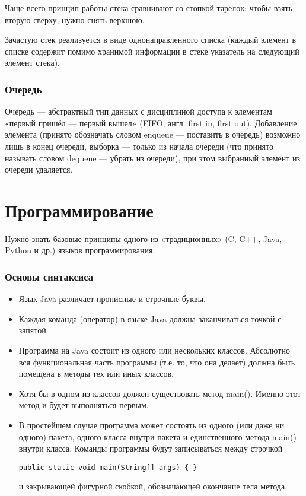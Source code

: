 \documentclass[12pt]{matmex-diploma}
\begin{document}
            Чаще всего принцип работы стека сравнивают со стопкой тарелок: чтобы взять вторую сверху, нужно снять верхнюю.
            
            Зачастую стек реализуется в виде однонаправленного списка (каждый элемент в списке содержит помимо хранимой информации в стеке указатель на следующий элемент стека).
            
        \subsubsection*{Очередь}
            Очередь — абстрактный тип данных с дисциплиной доступа к элементам «первый пришёл — первый вышел» (FIFO, англ. first in, first out). Добавление элемента (принято обозначать словом enqueue — поставить в очередь) возможно лишь в конец очереди, выборка — только из начала очереди (что принято называть словом dequeue — убрать из очереди), при этом выбранный элемент из очереди удаляется.
            
\section{Программирование}     

    Нужно знать базовые принципы одного из «традиционных» (C, C++, Java, Python и др.) языков программирования.
    
    \subsubsection*{Основы синтаксиса}
        \begin{itemize}
            \item Язык Java различает прописные и строчные буквы.
            \item Каждая команда (оператор) в языке Java должна заканчиваться точкой с запятой.
            \item Программа на Java состоит из одного или нескольких классов. Абсолютно вся функциональная часть программы (т.е. то, что она делает) должна быть помещена в методы тех или иных классов.
            \item Хотя бы в одном из классов должен существовать метод main(). Именно этот метод и будет выполняться первым.
            \item В простейшем случае программа может состоять из одного (или даже ни одного) пакета, одного класса внутри пакета и единственного метода main() внутри класса. Команды программы будут записываться между строчкой         \begin{verbatim}
public static void main(String[] args) { }
		        \end{verbatim} 
		        и закрывающей фигурной скобкой, обозначающей окончание тела метода.
        \end{itemize}
\end{document}
